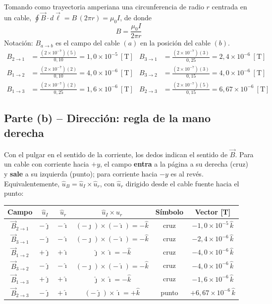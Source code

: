 \documentclass[12pt,letterpaper]{article}
\begin{document}
Tomando como trayectoria amperiana una circunferencia de radio $r$ centrada en un cable,
$\oint\vec{B}\cdot d\vec{\ell} = B\,(2\pi r) = \mu_0 I$, de donde
\[
    B = \frac{\mu_0 I}{2\pi r}
\]
Notaci\'on: $B_{a\to b}$ es el campo del cable $(a)$ en la posici\'on del cable $(b)$.
\begin{align*}
    B_{2\to1} &= \frac{(2\times10^{-7})(5)}{0{,}10} = 1{,}0\times10^{-5}\ [\text{T}] &
    B_{3\to1} &= \frac{(2\times10^{-7})(3)}{0{,}25} = 2{,}4\times10^{-6}\ [\text{T}] \\[4pt]
    B_{1\to2} &= \frac{(2\times10^{-7})(2)}{0{,}10} = 4{,}0\times10^{-6}\ [\text{T}] &
    B_{3\to2} &= \frac{(2\times10^{-7})(3)}{0{,}15} = 4{,}0\times10^{-6}\ [\text{T}] \\[4pt]
    B_{1\to3} &= \frac{(2\times10^{-7})(2)}{0{,}25} = 1{,}6\times10^{-6}\ [\text{T}] &
    B_{2\to3} &= \frac{(2\times10^{-7})(5)}{0{,}15} = 6{,}67\times10^{-6}\ [\text{T}]
\end{align*}

\subsection*{Parte (b) -- Direcci\'on: regla de la mano derecha}

Con el pulgar en el sentido de la corriente, los dedos indican el sentido de $\vec{B}$. Para un cable
con corriente hacia $+y$, el campo \textbf{entra} a la p\'agina a su derecha (cruz) y \textbf{sale} a
su izquierda (punto); para corriente hacia $-y$ es al rev\'es. Equivalentemente,
$\hat{u}_B = \hat{u}_I\times\hat{u}_r$, con $\hat{u}_r$ dirigido desde el cable fuente hacia el
punto:

\begin{center}
\renewcommand{\arraystretch}{1.4}
\begin{tabular}{|c|c|c|c|c|c|}
\hline
\textbf{Campo} & $\hat{u}_I$ & $\hat{u}_r$ & $\hat{u}_I\times\hat{u}_r$ & \textbf{S\'imbolo} & \textbf{Vector [T]} \\
\hline
$\vec{B}_{2\to1}$ & $-\hat{\jmath}$ & $-\hat{\imath}$ & $(-\hat{\jmath})\times(-\hat{\imath}) = -\hat{k}$
    & cruz & $-1{,}0\times10^{-5}\,\hat{k}$ \\
$\vec{B}_{3\to1}$ & $-\hat{\jmath}$ & $-\hat{\imath}$ & $(-\hat{\jmath})\times(-\hat{\imath}) = -\hat{k}$
    & cruz & $-2{,}4\times10^{-6}\,\hat{k}$ \\
\hline
$\vec{B}_{1\to2}$ & $+\hat{\jmath}$ & $+\hat{\imath}$ & $\hat{\jmath}\times\hat{\imath} = -\hat{k}$
    & cruz & $-4{,}0\times10^{-6}\,\hat{k}$ \\
$\vec{B}_{3\to2}$ & $-\hat{\jmath}$ & $-\hat{\imath}$ & $(-\hat{\jmath})\times(-\hat{\imath}) = -\hat{k}$
    & cruz & $-4{,}0\times10^{-6}\,\hat{k}$ \\
\hline
$\vec{B}_{1\to3}$ & $+\hat{\jmath}$ & $+\hat{\imath}$ & $\hat{\jmath}\times\hat{\imath} = -\hat{k}$
    & cruz & $-1{,}6\times10^{-6}\,\hat{k}$ \\
$\vec{B}_{2\to3}$ & $-\hat{\jmath}$ & $+\hat{\imath}$ & $(-\hat{\jmath})\times\hat{\imath} = +\hat{k}$
    & punto & $+6{,}67\times10^{-6}\,\hat{k}$ \\
\hline
\end{tabular}
\end{center}
\end{document}
